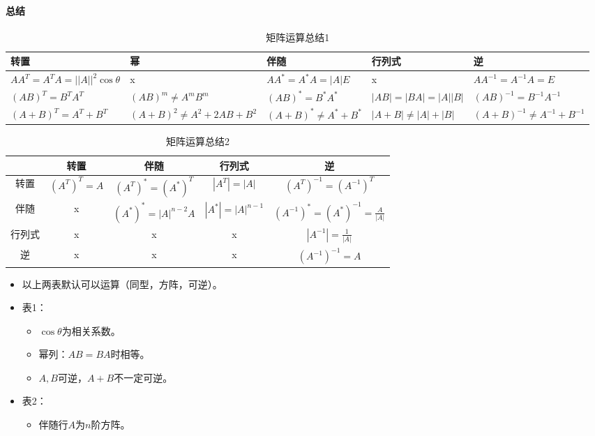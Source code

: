 \documentclass[
12pt, %
a4paper, 
oneside, %
headinclude,footinclude, %
]{scrartcl}
\begin{document}
\paragraph{总结}
\begin{table}[hbt]
\caption{矩阵运算总结1}
\centering
\begin{tabular}{|p{2.8cm}|p{2.8cm}|p{2.8cm}|p{2.8cm}|p{2.8cm}|}
\hline
转置 & 幂 & 伴随 & 行列式 & 逆 \\
\hline
$ AA^T = A^TA = ||A||^2 \cos\theta $ & x & $ AA^* = A^*A = |A|E $ & x & $ AA^{-1} = A^{-1}A = E $ \\
\hline
$ (AB)^T = B^TA^T $ & $ (AB)^m \neq A^mB^m $ & $ (AB)^* = B^*A^* $ & $ |AB| = |BA| = |A||B| $ & $ (AB)^{-1} = B^{-1}A^{-1} $ \\
\hline
$ (A + B)^T = A^T + B^T $ & $ (A + B)^2 \neq A^2 + 2AB + B^2 $ & $ (A + B)^* \neq A^* + B^* $ & $ |A + B| \neq |A| + |B| $ & $ (A + B)^{-1} \neq A^{-1} + B^{-1} $ \\
\hline
\end{tabular}
\end{table}

\begin{table}[hbt]
\caption{矩阵运算总结2}
\centering
\begin{tabular}{|c|c|c|c|c|}
\hline
& 转置 & 伴随 & 行列式 & 逆 \\
\hline
转置 & $ (A^T)^T = A $ & $ (A^T)^* = (A^*)^T $ & $ |A^T| = |A| $ & $ (A^T)^{-1} = (A^{-1})^T $ \\
\hline
伴随 & x & $ (A^*)^* = |A|^{n - 2}A $ & $ |A^*| = |A|^{n - 1} $ & $ (A^{-1})^* = (A^*)^{-1} = \frac{A}{|A|} $ \\
\hline
行列式 & x & x & x & $ |A^{-1}| = \frac{1}{|A|} $ \\
\hline
逆 & x & x & x & $ (A^{-1})^{-1} = A $ \\
\hline
\end{tabular}
\end{table}

\begin{itemize}
\item 以上两表默认可以运算（同型，方阵，可逆）。
\item 表1：
\begin{itemize}
\item $ \cos\theta $为相关系数。
\item 幂列：$ AB = BA $时相等。
\item $ A,B $可逆，$ A + B $不一定可逆。
\end{itemize}
\item 表2：
\begin{itemize}
\item 伴随行$ A $为$ n $阶方阵。
\end{itemize}
\end{itemize}
\end{document}
